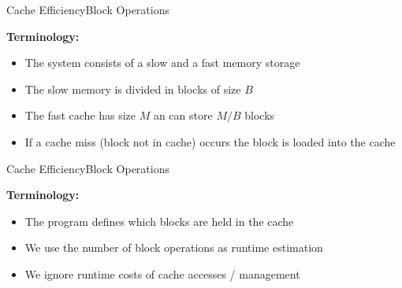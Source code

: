 
\begin{frame}{Cache Efficiency}{Block Operations}
  \vspace{-2.0em}
  \begin{figure}%
    \begin{adjustbox}{width=\linewidth}%
    \end{adjustbox}%
    \label{fig:caching:cache_quanting}
  \end{figure}%
  \textbf{Terminology:}
  \begin{itemize}
    \item
      The system consists of a slow and a fast memory storage
    \item
      The {\color{Mittel-Blau}slow memory} is divided in
      {\color{Mittel-Blau}blocks of size $B$}
    \item
      The {\color{Mittel-Blau}fast cache} has size $M$ an can store $M/B$
      blocks
    \item
      If a {\color{Mittel-Blau}cache miss} (block not in cache) occurs the
      block is loaded into the {\color{Mittel-Blau}cache}
  \end{itemize}
\end{frame}


\begin{frame}{Cache Efficiency}{Block Operations}
  \vspace{-2.0em}
  \begin{figure}%
    \begin{adjustbox}{width=\linewidth}%
    \end{adjustbox}%
    \label{fig:caching:cache_quanting2}
  \end{figure}%
  \textbf{Terminology:}
  \begin{itemize}
    \item
      The program defines which blocks are held in the
      {\color{Mittel-Blau}cache}
    \item
      We use the number of {\color{Mittel-Blau}block operations} as runtime
      estimation
    \item
      We ignore runtime costs of cache accesses / management
  \end{itemize}
\end{frame}

